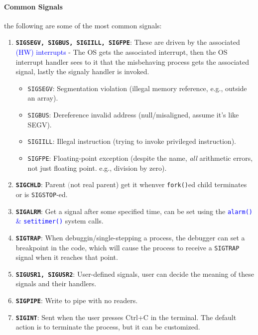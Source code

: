\documentclass[openany,12pt]{book}
\newcommand{\code}[1]{\texttt{#1}}
\newcommand{\blue}[1]{\textcolor{blue}{#1}}
\newcommand{\gray}[1]{\textcolor{gray}{#1}}
\begin{document}
\paragraph{Common Signals} the following are some of the most common signals:
\begin{enumerate}
    \item \textbf{\code{SIGSEGV, SIGBUS, SIGIILL, SIGFPE}}: These are driven by the associated \blue{(HW) interrupts} - The OS gets the associated interrupt, then the OS interrupt handler sees to it that the misbehaving process gets the associated signal, lastly the signaly handler is invoked.
          \begin{itemize}
              \item \texttt{SIGSEGV}: Segmentation violation (illegal memory reference, e.g., outside an array).
              \item \texttt{SIGBUS}: Dereference invalid address (null/misaligned, assume it's like SEGV).
              \item \texttt{SIGIILL}: Illegal instruction (trying to invoke privileged instruction).
              \item \texttt{SIGFPE}: Floating-point exception (despite the name, \textit{all} arithmetic errors, not just floating point. e.g., division by zero).
          \end{itemize}

    \item \textbf{\code{SIGCHLD}}: Parent \gray(not real parent) get it whenver \code{fork()}ed child terminates or is \code{SIGSTOP}-ed.

    \item \textbf{\code{SIGALRM}}: Get a signal after some specified time, can be set using the \blue{\code{alarm()} \& \code{setitimer()}} system calls.

    \item \textbf{\code{SIGTRAP}}: When debuggin/single-stepping a process, the debugger can set a breakpoint in the code, which will cause the process to receive a \texttt{SIGTRAP} signal when it reaches that point.

    \item \textbf{\code{SIGUSR1, SIGUSR2}}: User-defined signals, user can decide the meaning of these signals and their handlers.

    \item \textbf{\code{SIGPIPE}}: Write to pipe with no readers.

    \item \textbf{\code{SIGINT}}: Sent when the user presses Ctrl+C in the terminal. The default action is to terminate the process, but it can be customized.


\end{enumerate}
\end{document}
